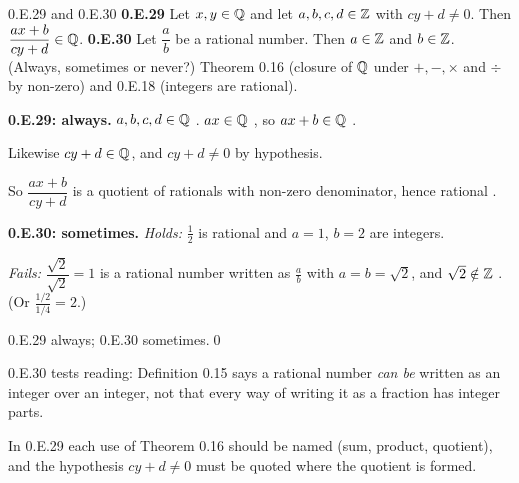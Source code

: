 \begin{bookex}[recommended]{0.E.29 and 0.E.30}
\textbf{0.E.29} Let $x,y\in\mathbb{Q}$ and let $a,b,c,d\in\mathbb{Z}$ with $cy+d\ne0$. Then $\dfrac{ax+b}{cy+d}\in\mathbb{Q}$. \quad \textbf{0.E.30} Let $\dfrac ab$ be a rational number. Then $a\in\mathbb{Z}$ and $b\in\mathbb{Z}$. \quad (Always, sometimes or never?)
\solution
\given Theorem 0.16 (closure of $\mathbb{Q}$ under $+,-,\times$ and $\div$ by non-zero) and 0.E.18 (integers are rational).
\begin{steps}
\item \textbf{0.E.29: always.} $a,b,c,d\in\mathbb{Q}$ . $ax\in\mathbb{Q}$ , so $ax+b\in\mathbb{Q}$ .
\item Likewise $cy+d\in\mathbb{Q}$, and $cy+d\ne0$ by hypothesis.
\item So $\dfrac{ax+b}{cy+d}$ is a quotient of rationals with non-zero denominator, hence rational .
\item \textbf{0.E.30: sometimes.} \emph{Holds:} $\frac12$ is rational and $a=1$, $b=2$ are integers.
\item \emph{Fails:} $\dfrac{\sqrt2}{\sqrt2}=1$ is a rational number written as $\frac ab$ with $a=b=\sqrt2$, and $\sqrt2\notin\mathbb{Z}$ . (Or $\frac{1/2}{1/4}=2$.)
\end{steps}
\conclusion 0.E.29 always; 0.E.30 sometimes.\qed
\begin{compare}
\item 0.E.30 tests reading: Definition 0.15 says a rational number \emph{can be} written as an integer over an integer, not that every way of writing it as a fraction has integer parts.
\item In 0.E.29 each use of Theorem 0.16 should be named (sum, product, quotient), and the hypothesis $cy+d\ne0$ must be quoted where the quotient is formed.
\end{compare}
\end{bookex}
